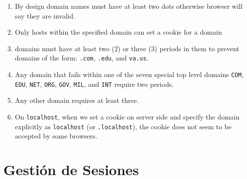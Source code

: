 \begin{enumerate}
\item 
By design domain names must have at least two dots otherwise browser
will say they are invalid.
\item 
Only hosts within the specified domain can set a cookie for a domain
\item 
domains must have at least two (2) or three (3) periods in them
to prevent domains of the form: \verb".com", \verb".edu", and \verb"va.us". 
\item 
Any
domain that fails within one of the seven special top level domains
\verb"COM", \verb"EDU", \verb"NET", \verb"ORG", \verb"GOV", \verb"MIL", and \verb"INT"
require two periods.
\item 
Any other domain requires at least three. 
\item 
On \verb|localhost|, when we set a cookie on server side and specify the
domain explicitly as \verb|localhost| (or \verb|.localhost|), the cookie does not
seem to be accepted by some browsers.
\end{enumerate}

\section{Gestión de Sesiones}
\label{section:gestiondesesiones}


